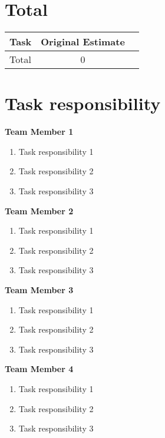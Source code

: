 \section{Total}

\begin{tabular} {| l | c | c |}\hline
	Task &	Original Estimate \\ \hline
	Total & 0 \\ \hline
\end{tabular}


\newpage

\section{Task responsibility}

\textbf{Team Member 1}
\begin{enumerate}[noitemsep]
	\item Task responsibility 1
	\item Task responsibility 2
	\item Task responsibility 3
\end{enumerate}

\textbf{Team Member 2}
\begin{enumerate}[noitemsep]
	\item Task responsibility 1
	\item Task responsibility 2
	\item Task responsibility 3
\end{enumerate}

\textbf{Team Member 3}
\begin{enumerate}[noitemsep]
	\item Task responsibility 1
	\item Task responsibility 2
	\item Task responsibility 3
\end{enumerate}

\textbf{Team Member 4}
\begin{enumerate}[noitemsep]
	\item Task responsibility 1
	\item Task responsibility 2
	\item Task responsibility 3
\end{enumerate}

